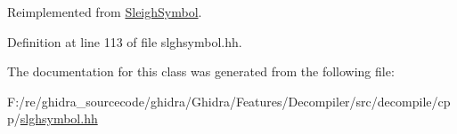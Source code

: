 Reimplemented from \mbox{\hyperlink{class_sleigh_symbol_a2f6e5903e461084c29f95ea024883950}{Sleigh\+Symbol}}.



Definition at line 113 of file slghsymbol.\+hh.



The documentation for this class was generated from the following file\+:\begin{DoxyCompactItemize}
\item 
F\+:/re/ghidra\+\_\+sourcecode/ghidra/\+Ghidra/\+Features/\+Decompiler/src/decompile/cpp/\mbox{\hyperlink{slghsymbol_8hh}{slghsymbol.\+hh}}\end{DoxyCompactItemize}
